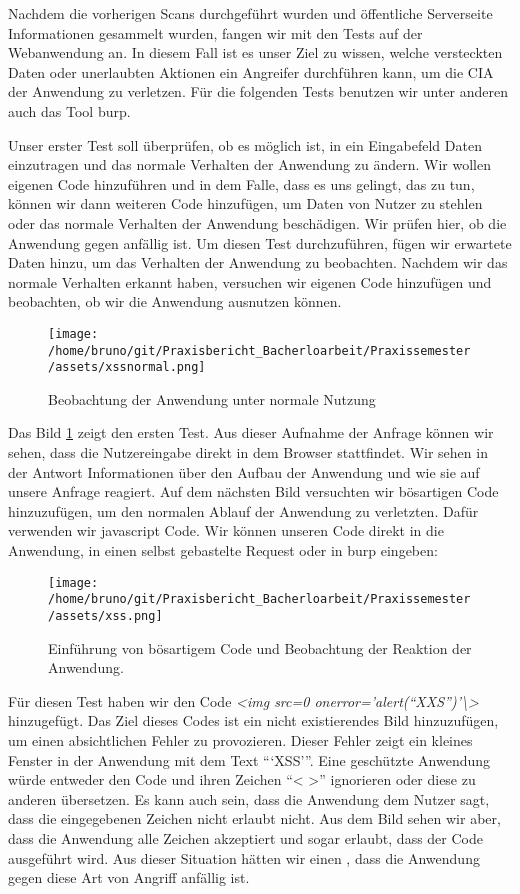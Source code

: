 Nachdem die vorherigen Scans durchgeführt wurden und öffentliche Serverseite Informationen gesammelt wurden, fangen wir mit den Tests auf der Webanwendung an. In diesem Fall ist es unser Ziel zu wissen, welche versteckten Daten oder unerlaubten Aktionen ein Angreifer durchführen kann, um die \gls{CIA} der Anwendung zu verletzen. Für die folgenden Tests benutzen wir unter anderen auch das Tool \gls{burp}.

Unser erster Test soll überprüfen, ob es möglich ist, in ein Eingabefeld Daten einzutragen und das normale Verhalten der Anwendung zu ändern. Wir wollen eigenen Code hinzuführen und in dem Falle, dass es uns gelingt, das zu tun, können wir dann weiteren Code hinzufügen, um Daten von Nutzer zu stehlen oder das normale Verhalten der Anwendung beschädigen. Wir prüfen hier, ob die Anwendung gegen  anfällig ist. Um diesen Test durchzuführen, fügen wir erwartete Daten hinzu, um das Verhalten der Anwendung zu beobachten. Nachdem wir das normale Verhalten erkannt haben, versuchen wir eigenen Code hinzufügen und beobachten, ob wir die Anwendung ausnutzen können. 

\begin{figure}[H]
    \centering
    \texttt{[image: /home/bruno/git/Praxisbericht\_Bacherloarbeit/Praxissemester/assets/xssnormal.png]}
    \caption{Beobachtung der Anwendung unter normale Nutzung}
    \label{fig:xssnormal}
    \centering
\end{figure}

Das Bild \ref{fig:xssnormal} zeigt den ersten Test. Aus dieser Aufnahme der Anfrage können wir sehen, dass die Nutzereingabe direkt in dem Browser stattfindet. Wir sehen in der Antwort Informationen über den Aufbau der Anwendung und wie sie auf unsere Anfrage reagiert. Auf dem nächsten Bild versuchten wir bösartigen Code hinzuzufügen, um den normalen Ablauf der Anwendung zu verletzten. Dafür verwenden wir \gls{javascript} Code. Wir können unseren Code direkt in die Anwendung, in einen selbst gebastelte Request oder in \gls{burp} eingeben:

\begin{figure}[H]
    \centering
    \texttt{[image: /home/bruno/git/Praxisbericht\_Bacherloarbeit/Praxissemester/assets/xss.png]}
    \caption{Einführung von bösartigem Code und Beobachtung der Reaktion der Anwendung.}
    \label{fig:xssexecuted}
    \centering
\end{figure}

Für diesen Test haben wir den Code \textit{<img src=0 onerror='alert(``XXS'')'\textbackslash>} hinzugefügt. Das Ziel dieses Codes ist ein nicht existierendes Bild hinzuzufügen, um einen absichtlichen Fehler zu provozieren. Dieser Fehler zeigt ein kleines Fenster in der Anwendung mit dem Text ```XSS'''. Eine geschützte Anwendung würde entweder den Code und ihren Zeichen ``< >'' ignorieren oder diese zu anderen übersetzen. Es kann auch sein, dass die Anwendung dem Nutzer sagt, dass die eingegebenen Zeichen nicht erlaubt nicht. Aus dem Bild sehen wir aber, dass die Anwendung alle Zeichen akzeptiert und sogar erlaubt, dass der Code ausgeführt wird. Aus dieser Situation hätten wir einen , dass die Anwendung gegen diese Art von Angriff anfällig ist.


